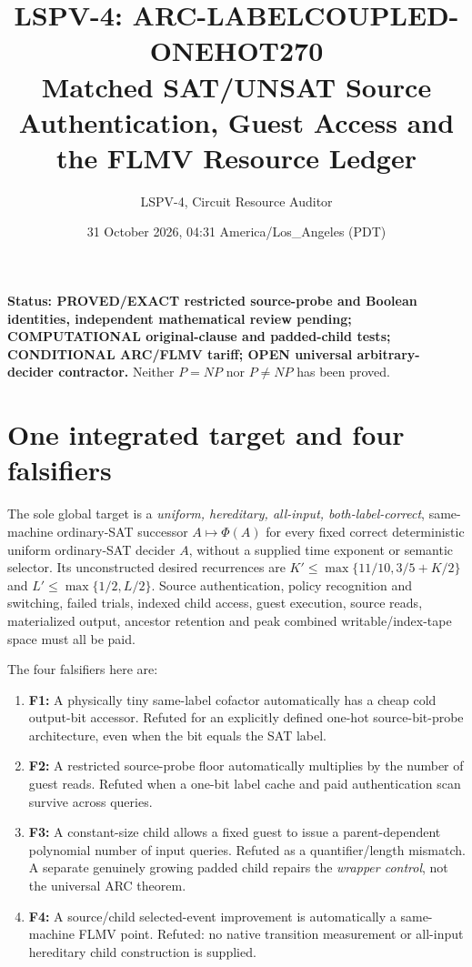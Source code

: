 \documentclass[11pt]{article}
\title{LSPV-4: ARC-LABELCOUPLED-ONEHOT270\\\large Matched SAT/UNSAT Source Authentication, Guest Access and the FLMV Resource Ledger}
\author{LSPV-4, Circuit Resource Auditor}
\date{31 October 2026, 04:31 America/Los\_Angeles (PDT)}
\begin{document}
\maketitle
\noindent\textbf{Status: PROVED/EXACT restricted source-probe and Boolean identities, independent mathematical review pending; COMPUTATIONAL original-clause and padded-child tests; CONDITIONAL ARC/FLMV tariff; OPEN universal arbitrary-decider contractor.} Neither $P=NP$ nor $P\ne NP$ has been proved.

\section{One integrated target and four falsifiers}
The sole global target is a \emph{uniform, hereditary, all-input, both-label-correct}, same-machine ordinary-SAT successor $A\mapsto\Phi(A)$ for every fixed correct deterministic uniform ordinary-SAT decider $A$, without a supplied time exponent or semantic selector. Its unconstructed desired recurrences are $K'\leq\max\{11/10,3/5+K/2\}$ and $L'\leq\max\{1/2,L/2\}$. Source authentication, policy recognition and switching, failed trials, indexed child access, guest execution, source reads, materialized output, ancestor retention and peak combined writable/index-tape space must all be paid.

The four falsifiers here are:
\begin{enumerate}
\item[] \textbf{F1:} A physically tiny same-label cofactor automatically has a cheap cold output-bit accessor. Refuted for an explicitly defined one-hot source-bit-probe architecture, even when the bit equals the SAT label.
\item[] \textbf{F2:} A restricted source-probe floor automatically multiplies by the number of guest reads. Refuted when a one-bit label cache and paid authentication scan survive across queries.
\item[] \textbf{F3:} A constant-size child allows a fixed guest to issue a parent-dependent polynomial number of input queries. Refuted as a quantifier/length mismatch. A separate genuinely growing padded child repairs the \emph{wrapper control}, not the universal ARC theorem.
\item[] \textbf{F4:} A source/child selected-event improvement is automatically a same-machine FLMV point. Refuted: no native transition measurement or all-input hereditary child construction is supplied.
\end{enumerate}
\end{document}
